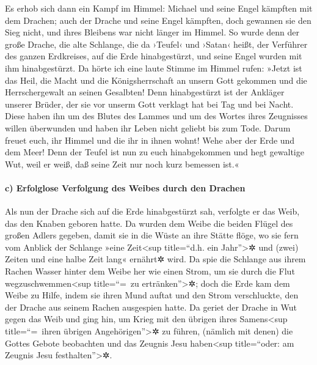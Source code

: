  Es erhob sich dann ein Kampf im Himmel: Michael und seine
Engel kämpften mit dem Drachen; auch der Drache und seine Engel
kämpften,  doch gewannen sie den Sieg nicht, und ihres
Bleibens war nicht länger im Himmel.  So wurde denn der
große Drache, die alte Schlange, die da ›Teufel‹ und ›Satan‹ heißt, der
Verführer des ganzen Erdkreises, auf die Erde hinabgestürzt, und seine
Engel wurden mit ihm hinabgestürzt.  Da hörte ich eine
laute Stimme im Himmel rufen: »Jetzt ist das Heil, die Macht und die
Königsherrschaft an unsern Gott gekommen und die Herrschergewalt an
seinen Gesalbten! Denn hinabgestürzt ist der Ankläger unserer Brüder,
der sie vor unserm Gott verklagt hat bei Tag und bei Nacht.
 Diese haben ihn um des Blutes des Lammes und um des
Wortes ihres Zeugnisses willen überwunden und haben ihr Leben nicht
geliebt bis zum Tode.  Darum freuet euch, ihr Himmel und
die ihr in ihnen wohnt! Wehe aber der Erde und dem Meer! Denn der Teufel
ist nun zu euch hinabgekommen und hegt gewaltige Wut, weil er weiß, daß
seine Zeit nur noch kurz bemessen ist.«

\hypertarget{c-erfolglose-verfolgung-des-weibes-durch-den-drachen}{%
\paragraph{c) Erfolglose Verfolgung des Weibes durch den
Drachen}\label{c-erfolglose-verfolgung-des-weibes-durch-den-drachen}}

 Als nun der Drache sich auf die Erde hinabgestürzt sah,
verfolgte er das Weib, das den Knaben geboren hatte.  Da
wurden dem Weibe die beiden Flügel des großen Adlers gegeben, damit sie
in die Wüste an ihre Stätte flöge, wo sie fern vom Anblick der Schlange
»eine Zeit\textless sup title=``d.h. ein Jahr''\textgreater✲ und (zwei)
Zeiten und eine halbe Zeit lang« ernährt✲ wird.  Da spie
die Schlange aus ihrem Rachen Wasser hinter dem Weibe her wie einen
Strom, um sie durch die Flut wegzuschwemmen\textless sup title=``=~zu
ertränken''\textgreater✲;  doch die Erde kam dem Weibe zu
Hilfe, indem sie ihren Mund auftat und den Strom verschluckte, den der
Drache aus seinem Rachen ausgespien hatte.  Da geriet der
Drache in Wut gegen das Weib und ging hin, um Krieg mit den übrigen
ihres Samens\textless sup title=``=~ihren übrigen
Angehörigen''\textgreater✲ zu führen, (nämlich mit denen) die Gottes
Gebote beobachten und das Zeugnis Jesu haben\textless sup title=``oder:
am Zeugnis Jesu festhalten''\textgreater✲.

